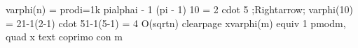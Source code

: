 {}\markdownRendererDollarSign{}\markdownRendererDollarSign{}\markdownRendererParagraphSeparator
{}\markdownRendererDollarSign{}\markdownRendererDollarSign{}\markdownRendererSoftLineBreak
{}\markdownRendererBackslash{}varphi(n) = \markdownRendererBackslash{}prod\markdownRendererUnderscore{}\markdownRendererLeftBrace{}i=1\markdownRendererRightBrace{}\markdownRendererCircumflex{}\markdownRendererLeftBrace{}k\markdownRendererRightBrace{} p\markdownRendererUnderscore{}i\markdownRendererCircumflex{}\markdownRendererLeftBrace{}\markdownRendererBackslash{}alpha\markdownRendererUnderscore{}i - 1\markdownRendererRightBrace{} (p\markdownRendererUnderscore{}i - 1)\markdownRendererSoftLineBreak
{}\markdownRendererDollarSign{}\markdownRendererDollarSign{}\markdownRendererParagraphSeparator
{} \markdownRendererDollarSign{}10 = 2 \markdownRendererBackslash{}cdot 5 ;\markdownRendererBackslash{}Rightarrow; \markdownRendererBackslash{}varphi(10) = 2\markdownRendererCircumflex{}\markdownRendererLeftBrace{}1-1\markdownRendererRightBrace{}(2-1) \markdownRendererBackslash{}cdot 5\markdownRendererCircumflex{}\markdownRendererLeftBrace{}1-1\markdownRendererRightBrace{}(5-1) = 4\markdownRendererDollarSign{}\markdownRendererParagraphSeparator
{} \markdownRendererDollarSign{}O(\markdownRendererBackslash{}sqrt\markdownRendererLeftBrace{}n\markdownRendererRightBrace{})\markdownRendererDollarSign{}\markdownRendererInterblockSeparator
{}\markdownRendererInterblockSeparator
{}\markdownRendererDollarSign{}\markdownRendererBackslash{}clearpage\markdownRendererDollarSign{}\markdownRendererInterblockSeparator
{}
\markdownRendererSectionEnd \markdownRendererSectionBegin
{}\markdownRendererInterblockSeparator
{}\markdownRendererParagraphSeparator
{}\markdownRendererDollarSign{}\markdownRendererDollarSign{}\markdownRendererSoftLineBreak
{}x\markdownRendererCircumflex{}\markdownRendererLeftBrace{}\markdownRendererBackslash{}varphi(m)\markdownRendererRightBrace{} \markdownRendererBackslash{}equiv 1 \markdownRendererBackslash{}pmod\markdownRendererLeftBrace{}m\markdownRendererRightBrace{}, \markdownRendererBackslash{}quad x \markdownRendererBackslash{}text\markdownRendererLeftBrace{} coprimo con \markdownRendererRightBrace{} m\markdownRendererSoftLineBreak
{}\markdownRendererDollarSign{}\markdownRendererDollarSign{}\markdownRendererParagraphSeparator
